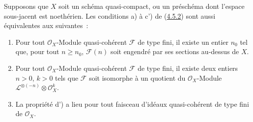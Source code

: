 \begin{proposition}[4.5.5]
\label{II.4.5.5-fr}
Supposons que $X$ soit un schéma quasi-compact, ou un préschéma dont l'espace
sous-jacent est noethérien. Les conditions \textup{a)} à \textup{c')} de
\textup{(\hyperref[II.4.5.2-fr]{4.5.2})} sont aussi équivalentes aux suivantes~:
\begin{enumerate}
  \item[\rm{d)}] Pour tout $\mathcal{O}_X$-Module quasi-cohérent
  $\mathcal{F}$ de type fini, il existe un entier $n_0$ tel que, pour tout
  $n\geq n_0$, $\mathcal{F}(n)$ soit engendré par ses sections au-dessus de
  $X$.
  \item[\rm{d')}] Pour tout $\mathcal{O}_X$-Module quasi-cohérent
  $\mathcal{F}$ de type fini, il existe deux entiers $n>0$, $k>0$ tels que
  $\mathcal{F}$ soit isomorphe à un quotient du $\mathcal{O}_X$-Module
  $\mathcal{L}^{\otimes(-n)}\otimes\mathcal{O}_X^k$.
  \item[\rm{d'')}] La propriété \textup{d')} a lieu pour tout faisceau d'idéaux
  quasi-cohérent de type fini de $\mathcal{O}_X$.
\end{enumerate}
\end{proposition}

